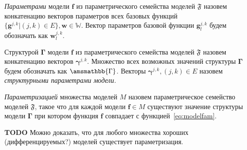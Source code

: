 \begin{defin}
\textit{Параметрами }модели $\mathbf{f}$ из параметрического семейства моделей $\mathfrak{F}$  назовем конкатенацию векторов параметров всех базовых функций $\{\mathbf{g}^{j,k}| {(j,k) \in E} \}, \mathbf{w} \in \mathbb{W}.$ Вектор параметров базовой функции $\mathbf{g}^{j,k}_l$ будем обозначать как $\mathbf{w}^{j,k}_l$.
\end{defin}



\begin{defin}
Структурой $\boldsymbol{\Gamma}$  модели $\mathbf{f}$ из параметрического семейства моделей $\mathfrak{F}$  назовем конкатенацию векторов $\boldsymbol{\gamma}^{j,k}$. Множество всех возможных значений структуры $\boldsymbol{\Gamma}$ будем обозначать как $\amsmathbb{\Gamma}$.
Векторы $\boldsymbol{\gamma}^{j,k}, (j,k) \in E$ назовем \textit{структурными параметрами модели.}
\end{defin}

\begin{defin}
\textit{Параметризацией }множества моделей $M$ назовем параметрическое семейство моделей $\mathfrak{F}$, такое что для каждой модели $\mathbf{f} \in M$ существуют значение структуры модели $\boldsymbol{\Gamma}$ при котором функция $\mathbf{f}$ совпадает с функцией~\eqref{eq:modelfam}.
\end{defin}

\textbf{TODO} Можно доказать, что для любого множества хороших (дифференцируемых?) моделей существует параметризация.

